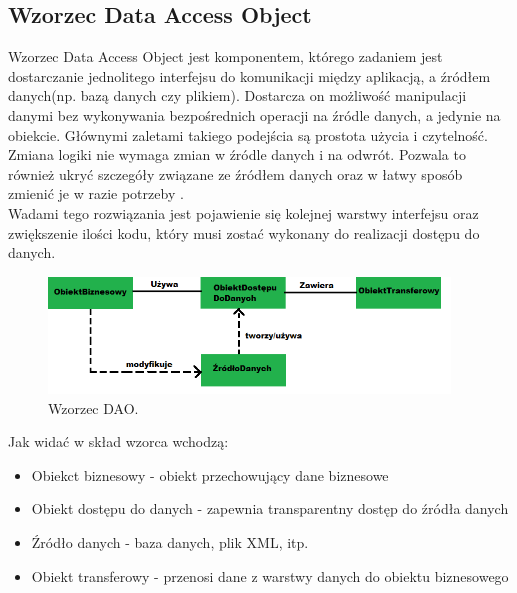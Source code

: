 \documentclass[12pt]{report}
\begin{document}
\subsection{Wzorzec Data Access Object}
	\indent Wzorzec Data Access Object jest komponentem, którego zadaniem jest dostarczanie jednolitego interfejsu do komunikacji między aplikacją, a źródłem danych(np. bazą danych czy plikiem). Dostarcza on możliwość manipulacji danymi bez wykonywania bezpośrednich operacji na źródle danych, a jedynie na obiekcie. Głównymi zaletami takiego podejścia są prostota użycia i czytelność. Zmiana logiki nie wymaga zmian w źródle danych i na odwrót. Pozwala to również ukryć szczegóły związane ze źródłem danych oraz w łatwy sposób zmienić je w razie potrzeby \cite{}. \\
	\indent Wadami tego rozwiązania jest pojawienie się kolejnej warstwy interfejsu oraz zwiększenie ilości kodu, który musi zostać wykonany do realizacji dostępu do danych.
\begin{figure}[h]
	\centering
	\includegraphics[width=0.95\textwidth]{images/dao.png}
	\caption{Wzorzec DAO.}
\end{figure}
\FloatBarrier
Jak widać w skład wzorca wchodzą:
\begin{itemize}
\item{Obiekct biznesowy - obiekt przechowujący dane biznesowe}
\item{Obiekt dostępu do danych - zapewnia transparentny dostęp do źródła danych}
\item{Źródło danych - baza danych, plik XML, itp.}
\item{Obiekt transferowy - przenosi dane z warstwy danych do obiektu biznesowego}
\end{itemize}
\end{document}
